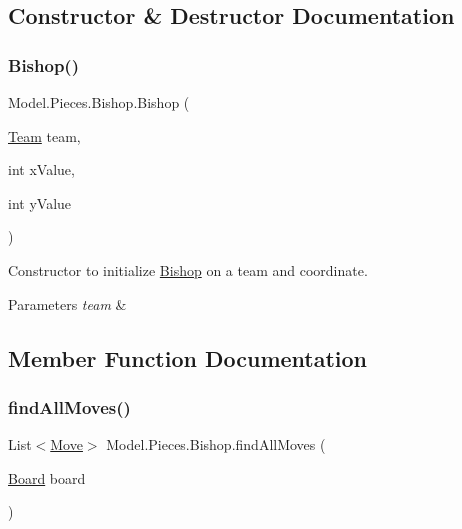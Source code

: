 \subsection{Constructor \& Destructor Documentation}
\hypertarget{class_model_1_1_pieces_1_1_bishop_a5f383759e28a0def1f6139861c9afa94}{}\label{class_model_1_1_pieces_1_1_bishop_a5f383759e28a0def1f6139861c9afa94} 
\subsubsection{\texorpdfstring{Bishop()}{Bishop()}}
{\footnotesize\ttfamily Model.\+Pieces.\+Bishop.\+Bishop (\begin{DoxyParamCaption}\item[{\hyperlink{class_model_1_1_team}{Team}}]{team,  }\item[{int}]{x\+Value,  }\item[{int}]{y\+Value }\end{DoxyParamCaption})}

Constructor to initialize \hyperlink{class_model_1_1_pieces_1_1_bishop}{Bishop} on a team and coordinate. 
\begin{DoxyParams}{Parameters}
{\em team} & \\
\hline
\end{DoxyParams}


\subsection{Member Function Documentation}
\hypertarget{class_model_1_1_pieces_1_1_bishop_a67fdc956c6f82e0b513aae4b86998b28}{}\label{class_model_1_1_pieces_1_1_bishop_a67fdc956c6f82e0b513aae4b86998b28} 
\subsubsection{\texorpdfstring{find\+All\+Moves()}{findAllMoves()}}
{\footnotesize\ttfamily List$<$\hyperlink{class_model_1_1_move}{Move}$>$ Model.\+Pieces.\+Bishop.\+find\+All\+Moves (\begin{DoxyParamCaption}\item[{\hyperlink{class_model_1_1_board}{Board}}]{board }\end{DoxyParamCaption})}

